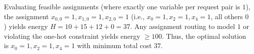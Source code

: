 \documentclass[12pt]{article}
\begin{document}
Evaluating feasible assignments (where exactly one variable per request pair is $1$), the assignment $x_{0,0}=1, x_{1,0}=1, x_{2,0}=1$ (i.e., $x_0=1, x_2=1, x_4=1$, all others $0$) yields energy $H = 10 + 15 + 12 + 0 = 37$. Any assignment routing to model $1$ or violating the one-hot constraint yields energy $\ge 100$. Thus, the optimal solution is $x_0=1, x_2=1, x_4=1$ with minimum total cost $37$.
\end{document}
